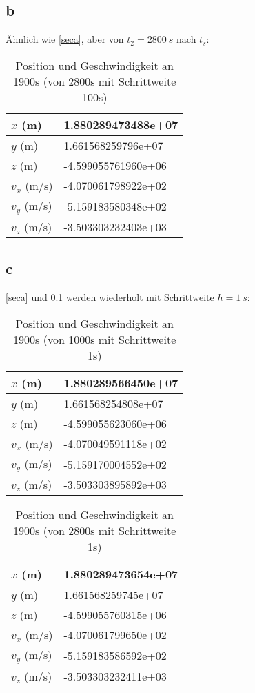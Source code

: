 \subsection{b}\label{secb}
Ähnlich wie \ref{seca}, aber von $t_2 = \SI{2800}{s}$ nach $t_s$:
\begin{table}[htbp]\centering
	\begin{tabular}{|l|l|}
		\hline
		$x$ (m)     & 1.880289473488e+07  \\ \hline
		$y$ (m)     & 1.661568259796e+07  \\ \hline
		$z$ (m)     & -4.599055761960e+06 \\ \hline
		$v_x$ (m/s) & -4.070061798922e+02 \\ \hline
		$v_y$ (m/s) & -5.159183580348e+02 \\ \hline
		$v_z$ (m/s) & -3.503303232403e+03 \\ \hline
	\end{tabular}
	\caption{Position und Geschwindigkeit an 1900s (von 2800s mit Schrittweite 100s)}
\end{table}
\subsection{c}\label{secc}
\ref{seca} und \ref{secb} werden wiederholt mit Schrittweite $h = \SI{1}{s}$:
\begin{table}[htpb]\centering
	\begin{tabular}{|l|l|}
		\hline
		$x$ (m)     & 1.880289566450e+07  \\ \hline
		$y$ (m)     & 1.661568254808e+07  \\ \hline
		$z$ (m)     & -4.599055623060e+06 \\ \hline
		$v_x$ (m/s) & -4.070049591118e+02 \\ \hline
		$v_y$ (m/s) & -5.159170004552e+02 \\ \hline
		$v_z$ (m/s) & -3.503303895892e+03 \\ \hline
	\end{tabular}
	\caption{Position und Geschwindigkeit an 1900s (von 1000s mit Schrittweite 1s)}
\end{table}\clearpage
\begin{table}[htbp]\centering
	\begin{tabular}{|l|l|}
		\hline
		$x$ (m)     & 1.880289473654e+07  \\ \hline
		$y$ (m)     & 1.661568259745e+07  \\ \hline
		$z$ (m)     & -4.599055760315e+06 \\ \hline
		$v_x$ (m/s) & -4.070061799650e+02 \\ \hline
		$v_y$ (m/s) & -5.159183586592e+02 \\ \hline
		$v_z$ (m/s) & -3.503303232411e+03 \\ \hline
	\end{tabular}
	\caption{Position und Geschwindigkeit an 1900s (von 2800s mit Schrittweite 1s)}
\end{table}
